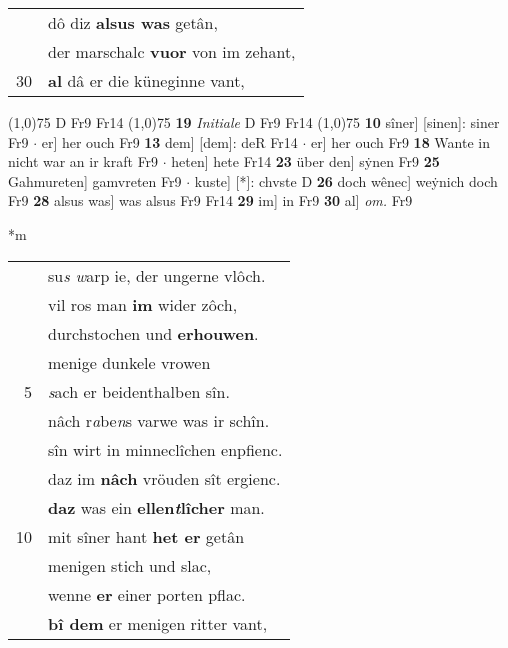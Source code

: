 \documentclass[8pt,a4paper,notitlepage]{article}
\begin{document}
\begin{table}[ht]
\begin{minipage}[t]{0.5\linewidth}
\begin{tabular}{rl}
 & dô diz \textbf{alsus was} getân,\\ 
 & der marschalc \textbf{vuor} von im zehant,\\ 
30 & \textbf{al} dâ er die küneginne vant,\\ 
\end{tabular}
\scriptsize
\line(1,0){75} \newline
D Fr9 Fr14 \newline
\line(1,0){75} \newline
\textbf{19} \textit{Initiale} D Fr9 Fr14  \newline
\line(1,0){75} \newline
\textbf{10} sîner] [sinen]: siner Fr9  $\cdot$ er] her ouch Fr9 \textbf{13} dem] [dem]: deR Fr14  $\cdot$ er] her ouch Fr9 \textbf{18} Wante in nicht war an ir kraft Fr9  $\cdot$ heten] hete Fr14 \textbf{23} über den] sẏnen Fr9 \textbf{25} Gahmureten] gamvreten Fr9  $\cdot$ kuste] [*]: chvste D \textbf{26} doch wênec] weẏnich doch Fr9 \textbf{28} alsus was] was alsus Fr9 Fr14 \textbf{29} im] in Fr9 \textbf{30} al] \textit{om.} Fr9 \newline
\end{minipage}
\hspace{0.5cm}
\begin{minipage}[t]{0.5\linewidth}
\small
\begin{center}*m
\end{center}
\begin{tabular}{rl}
 & su\textit{s w}arp ie, der ungerne vlôch.\\ 
 & vil ros man \textbf{im} wider zôch,\\ 
 & durchstochen und \textbf{erhouwen}.\\ 
 & menige dunkele vrowen\\ 
5 & \textit{s}ach er beidenthalben sîn.\\ 
 & nâch r\textit{a}be\textit{n}s varwe was ir schîn.\\ 
 & sîn wirt in minneclîchen enpfienc.\\ 
 & daz im \textbf{nâch} vröuden sît ergienc.\\ 
 & \textbf{daz} was ein \textbf{ellen\textit{t}lîcher} man.\\ 
10 & mit sîner hant \textbf{het er} getân\\ 
 & menigen stich und slac,\\ 
 & wenne \textbf{er} einer porten pflac.\\ 
 & \textbf{bî dem} er menigen ritter vant,\\ 

\end{tabular}
\end{minipage}
\end{table}
\end{document}
